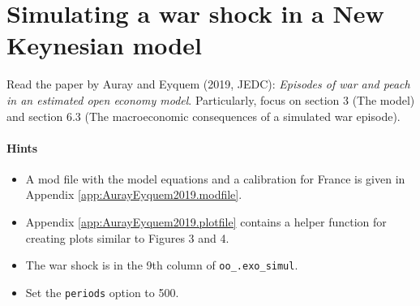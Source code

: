 \documentclass{article}
\begin{document}
\newpage

\section{Simulating a war shock in a New Keynesian model}
Read the paper by Auray and Eyquem (2019, JEDC): \emph{Episodes of war and peach in an estimated open economy model}.
Particularly, focus on section 3 (The model) and section 6.3 (The macroeconomic consequences of a simulated war episode).

\paragraph{Hints}
\begin{itemize}
  \item A mod file with the model equations and a calibration for France is given in Appendix \ref{app:AurayEyquem2019.modfile}.
  \item Appendix \ref{app:AurayEyquem2019.plotfile} contains a helper function for creating plots similar to Figures 3 and 4.
  \item The war shock is in the 9th column of \texttt{oo\_.exo\_simul}.
  \item Set the \texttt{periods} option to 500.
\end{itemize}
\end{document}
